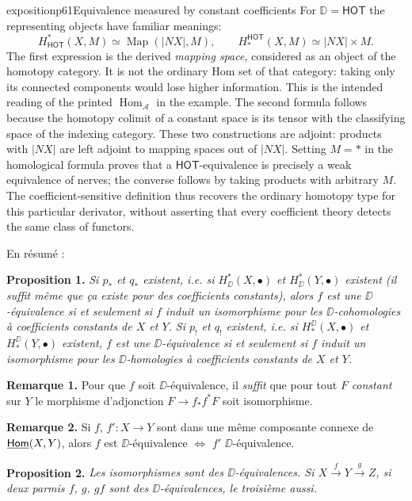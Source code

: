 \begin{dcomment}{exposition}{p61}{Equivalence measured by constant coefficients}
For $\mathbb D=\mathsf{HOT}$ the representing objects have familiar meanings:
\[
 H^*_{\mathsf{HOT}}(X,M)\simeq
 \operatorname{Map}(|NX|,M),
 \qquad
 H_*^{\mathsf{HOT}}(X,M)\simeq |NX|\times M.
\]
The first expression is the derived \emph{mapping space}, considered as an object of the homotopy category. It is not the ordinary Hom set of that category: taking only its connected components would lose higher information. This is the intended reading of the printed $\operatorname{Hom}_{\mathcal A}$ in the example. The second formula follows because the homotopy colimit of a constant space is its tensor with the classifying space of the indexing category. These two constructions are adjoint: products with $|NX|$ are left adjoint to mapping spaces out of $|NX|$. Setting $M=*$ in the homological formula proves that a $\mathsf{HOT}$-equivalence is precisely a weak equivalence of nerves; the converse follows by taking products with arbitrary $M$. The coefficient-sensitive definition thus recovers the ordinary homotopy type for this particular derivator, without asserting that every coefficient theory detects the same class of functors.
\end{dcomment}


\noindent En résumé :

\noindent\textbf{Proposition 1.} \textit{Si $p_*$ et $q_*$ existent, i.e. si $H^*_{\DD}(X, \bullet)$ et $H^*_{\DD}(Y, \bullet)$ existent (il suffit même que ça existe pour des coefficients constants), alors $f$ est une $\DD$-équivalence si et seulement si $f$ induit un isomorphisme pour les $\DD$-cohomologies à coefficients constants de $X$ et $Y$. Si $p_!$ et $q_!$ existent, i.e. si $H^{\DD}_*(X, \bullet)$ et $H^{\DD}_*(Y, \bullet)$ existent, $f$ est une $\DD$-équivalence si et seulement si $f$ induit un isomorphisme pour les $\DD$-homologies à coefficients constants de $X$ et $Y$.}

\noindent\textbf{Remarque 1.} Pour que $f$ soit $\DD$-équivalence, il \textit{suffit} que pour tout $F$ \textit{constant} sur $Y$ le morphisme d'adjonction $F \to f_*f^*F$ soit isomorphisme.

\noindent\textbf{Remarque 2.} Si $f$, $f' : X \to Y$ sont dans une même composante connexe de $\underline{\mathsf{Hom}}(X, Y)$, alors $f$ est $\DD$-équivalence $\Leftrightarrow$ $f'$ $\DD$-équivalence.

\noindent\textbf{Proposition 2.} \textit{Les isomorphismes sont des $\DD$-équivalences. Si $X \overset{f}{\to} Y \overset{g}{\to} Z$, si deux parmis $f$, $g$, $gf$ sont des $\DD$-équivalences, le troisième aussi.} %

